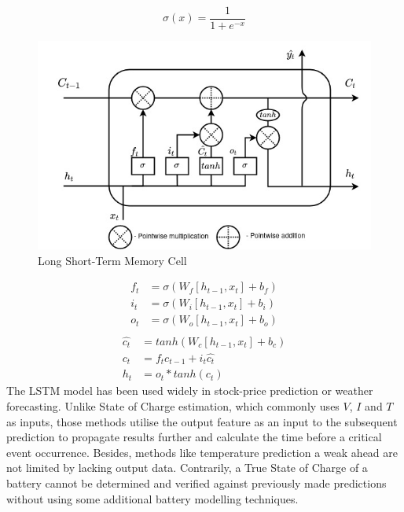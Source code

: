 %
%
\begin{equation}
    \sigma(x) = \frac{1}{1+e^{-x}}
    \label{eq:sigmoid2}
\end{equation}
\begin{figure}[ht]%
    \centering
    \includegraphics[width=0.7\linewidth]{II_Body/LSTM/images/LSTM.jpg}
    \caption{Long Short-Term Memory Cell}
    \label{fig:LSTM-cell2}
\end{figure}
\begin{equation}
    \begin{split}
        f_t &= \sigma \left(W_f \left[h_{t-1}, x_t \right] + b_f \right) \\
        i_t &= \sigma \left(W_i \left[h_{t-1}, x_t \right] + b_i \right) \\
        o_t &= \sigma \left(W_o \left[h_{t-1}, x_t \right] + b_o \right) \\    
    \end{split}
    \label{eq:LSTM-gates2}
\end{equation}
\begin{equation}
    \begin{split}
        \hat{c_t} &= tanh \left(W_c \left[h_{t-1}, x_t \right] + b_c \right) \\
              c_t &= f_t c_{t-1}+i_t \hat{c_t} \\
              h_t &= o_t*tanh \left(c_t \right)
    \end{split}
    \label{eq:LSTM-output2}
\end{equation}
The LSTM model has been used widely in stock-price prediction or weather forecasting.
Unlike State of Charge estimation, which commonly uses $V$, $I$ and $T$ as inputs, those methods utilise the output feature as an input to the subsequent prediction to propagate results further and calculate the time before a critical event occurrence.
Besides, methods like temperature prediction a weak ahead are not limited by lacking output data.
Contrarily, a True State of Charge of a battery cannot be determined and verified against previously made predictions without using some additional battery modelling techniques.

